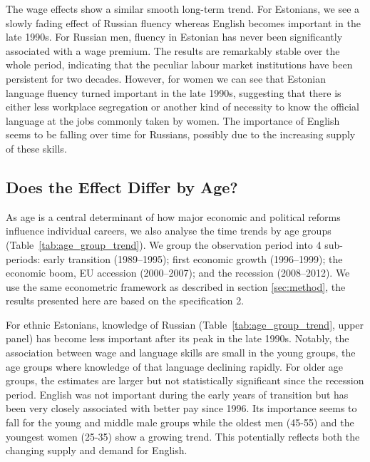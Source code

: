 \documentclass[12pt, a4paper]{article}
\begin{document}
The wage effects show a similar smooth long-term trend. For Estonians, we
see a slowly fading effect of Russian fluency whereas
English becomes important in the late 1990s. For Russian men, fluency in Estonian
has never been significantly associated with a wage premium.
The results are remarkably stable over the whole period, indicating
that the peculiar labour market institutions have been persistent for
two decades. However, for women we can see that Estonian language fluency turned
important in the late 1990s, suggesting that there is either less
workplace segregation or another kind of necessity to know the official
language at
the jobs commonly taken by women. The
importance of English seems to be falling over time for Russians, possibly
due to the increasing supply of these skills. 


\subsection{Does the Effect Differ by Age?}
\label{sec:age_groups}
As age is a central determinant of how major economic and political
reforms influence individual careers, 
we also analyse the time trends by age groups
(Table~\ref{tab:age_group_trend}).
We group the observation period into 4 sub-periods: early transition
(1989--1995); first economic growth (1996--1999);
the economic boom, EU accession (2000--2007); and the recession
(2008--2012).
We use the same econometric framework as described in section
\ref{sec:method}, the results presented here are based on the specification 2.

For ethnic Estonians, knowledge of Russian
(Table~\ref{tab:age_group_trend}, upper panel) has become less
important after its peak in the late 1990s. Notably, the
association between wage and language skills are small in the
young groups, the age groups where knowledge of that language
declining rapidly.
For older age groups, the estimates are larger but not statistically
significant since the recession period. English was not important
during the early years of transition but has been very closely
associated with better pay since 1996. Its importance seems to
fall for the young and middle male groups while the oldest men
(45-55) and the youngest women (25-35) show a growing trend.
This potentially reflects both the changing supply and demand for 
English.
\end{document}
